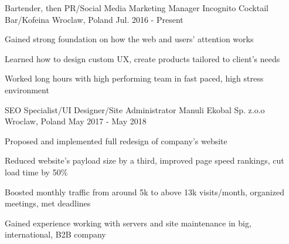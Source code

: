 \begin{cventries}

  \cventry
    {Bartender, then PR/Social Media Marketing Manager} %
    {Incognito Cocktail Bar/Kofeina} %
    {Wroclaw, Poland} %
    {Jul. 2016 - Present} %
    {
      \begin{cvitems} %
        \item Gained strong foundation on how the web and users' attention works
        \item Learned how to design custom UX, create products tailored to client's needs
        \item Worked long hours with high performing team in fast paced, high stress environment
      \end{cvitems}
    }

  \cventry
    {SEO Specialist/UI Designer/Site Administrator} %
    {Manuli Ekobal Sp. z.o.o} %
    {Wroclaw, Poland} %
    {May 2017 - May 2018} %
    {
      \begin{cvitems} %
      \item Proposed and implemented full redesign of company's website
        \item Reduced website's payload size by a third, improved page speed rankings, cut load time by 50\%
        \item Boosted monthly traffic from around 5k to above 13k visits/month, organized meetings, met deadlines
        \item Gained experience working with servers and site maintenance in big, international, B2B company
      \end{cvitems}
    }

\end{cventries}
